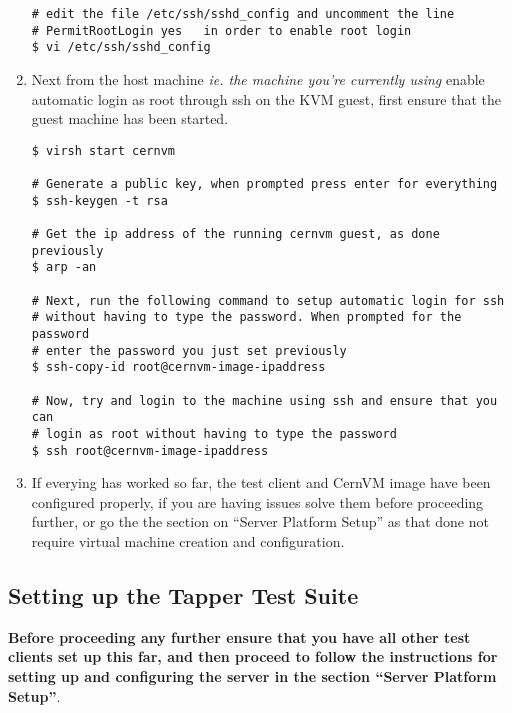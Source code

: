 \begin{enumerate}
\begin{lstlisting}
# edit the file /etc/ssh/sshd_config and uncomment the line 
# PermitRootLogin yes	in order to enable root login
$ vi /etc/ssh/sshd_config
\end{lstlisting}

\item Next from the host machine \emph{ie. the machine you're currently using} enable automatic login as root 
through ssh on the KVM guest, first ensure that the guest machine has been started.
\lstset{caption= Enable Automatic SSH Root Login}
\begin{lstlisting}
$ virsh start cernvm

# Generate a public key, when prompted press enter for everything
$ ssh-keygen -t rsa

# Get the ip address of the running cernvm guest, as done previously
$ arp -an

# Next, run the following command to setup automatic login for ssh
# without having to type the password. When prompted for the password
# enter the password you just set previously
$ ssh-copy-id root@cernvm-image-ipaddress
		
# Now, try and login to the machine using ssh and ensure that you can
# login as root without having to type the password
$ ssh root@cernvm-image-ipaddress
\end{lstlisting}

\item If everying has worked so far, the test client and CernVM image have been configured properly, if you are
having issues solve them before proceeding further, or go the the section on ``Server Platform Setup'' as that
done not require virtual machine creation and configuration.
\end{enumerate}

\subsection{Setting up the Tapper Test Suite}
\item {\bf Before proceeding any further ensure that you have all other test clients set up this far, and then proceed
to follow the instructions for setting up and configuring the \tapper server in the section ``Server Platform Setup''}.
